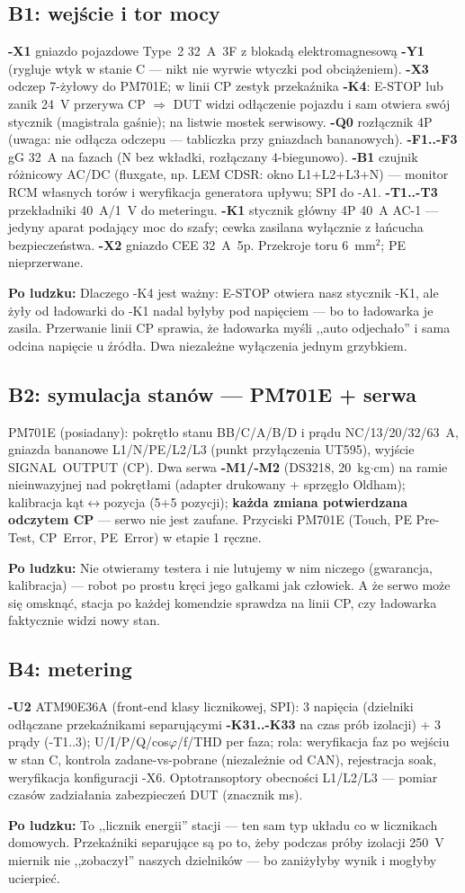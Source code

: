 \documentclass[11pt,a4paper]{article}
\newcommand{\why}[1]{\par\smallskip\noindent\colorbox{blue!6}{\parbox{0.965\linewidth}{\small\textbf{Po ludzku:} #1}}\par\smallskip}
\begin{document}
\subsection{B1: wejście i tor mocy}
\textbf{-X1} gniazdo pojazdowe Type~2 32~A~3F z blokadą elektromagnesową \textbf{-Y1} (rygluje
wtyk w stanie C --- nikt nie wyrwie wtyczki pod obciążeniem). \textbf{-X3} odczep 7-żyłowy do
PM701E; w linii CP zestyk przekaźnika \textbf{-K4}: E-STOP lub zanik 24~V przerywa CP
$\Rightarrow$ DUT widzi odłączenie pojazdu i sam otwiera swój stycznik (magistrala gaśnie);
na listwie mostek serwisowy. \textbf{-Q0} rozłącznik 4P (uwaga: nie odłącza odczepu --- tabliczka
przy gniazdach bananowych). \textbf{-F1..-F3} gG 32~A na fazach (N bez wkładki, rozłączany
4-biegunowo). \textbf{-B1} czujnik różnicowy AC/DC (fluxgate, np. LEM CDSR: okno L1+L2+L3+N) ---
monitor RCM własnych torów i weryfikacja generatora upływu; SPI do -A1. \textbf{-T1..-T3}
przekładniki 40~A/1~V do meteringu. \textbf{-K1} stycznik główny 4P 40~A AC-1 --- jedyny aparat
podający moc do szafy; cewka zasilana wyłącznie z łańcucha bezpieczeństwa. \textbf{-X2} gniazdo
CEE 32~A~5p. Przekroje toru 6~mm$^2$; PE nieprzerwane.
\why{Dlaczego -K4 jest ważny: E-STOP otwiera nasz stycznik -K1, ale żyły od ładowarki do -K1
nadal byłyby pod napięciem --- bo to ładowarka je zasila. Przerwanie linii CP sprawia, że
ładowarka myśli ,,auto odjechało'' i sama odcina napięcie u źródła. Dwa niezależne wyłączenia
jednym grzybkiem.}
\subsection{B2: symulacja stanów --- PM701E + serwa}
PM701E (posiadany): pokrętło stanu BB/C/A/B/D i prądu NC/13/20/32/63~A, gniazda bananowe
L1/N/PE/L2/L3 (punkt przyłączenia UT595), wyjście SIGNAL~OUTPUT (CP). Dwa serwa \textbf{-M1/-M2}
(DS3218, 20~kg$\cdot$cm) na ramie nieinwazyjnej nad pokrętłami (adapter drukowany + sprzęgło
Oldham); kalibracja kąt$\leftrightarrow$pozycja (5+5 pozycji); \textbf{każda zmiana potwierdzana
odczytem CP} --- serwo nie jest zaufane. Przyciski PM701E (Touch, PE Pre-Test, CP~Error,
PE~Error) w etapie 1 ręczne.
\why{Nie otwieramy testera i nie lutujemy w nim niczego (gwarancja, kalibracja) --- robot po
prostu kręci jego gałkami jak człowiek. A że serwo może się omsknąć, stacja po każdej komendzie
sprawdza na linii CP, czy ładowarka faktycznie widzi nowy stan.}
\subsection{B4: metering}
\textbf{-U2} ATM90E36A (front-end klasy licznikowej, SPI): 3 napięcia (dzielniki odłączane
przekaźnikami separującymi \textbf{-K31..-K33} na czas prób izolacji) + 3 prądy (-T1..3);
U/I/P/Q/cos$\varphi$/f/THD per faza; rola: weryfikacja faz po wejściu w stan C, kontrola
zadane-vs-pobrane (niezależnie od CAN), rejestracja soak, weryfikacja konfiguracji -X6.
Optotransoptory obecności L1/L2/L3 --- pomiar czasów zadziałania zabezpieczeń DUT (znacznik ms).
\why{To ,,licznik energii'' stacji --- ten sam typ układu co w licznikach domowych. Przekaźniki
separujące są po to, żeby podczas próby izolacji 250~V miernik nie ,,zobaczył'' naszych
dzielników --- bo zaniżyłyby wynik i mogłyby ucierpieć.}
\end{document}
